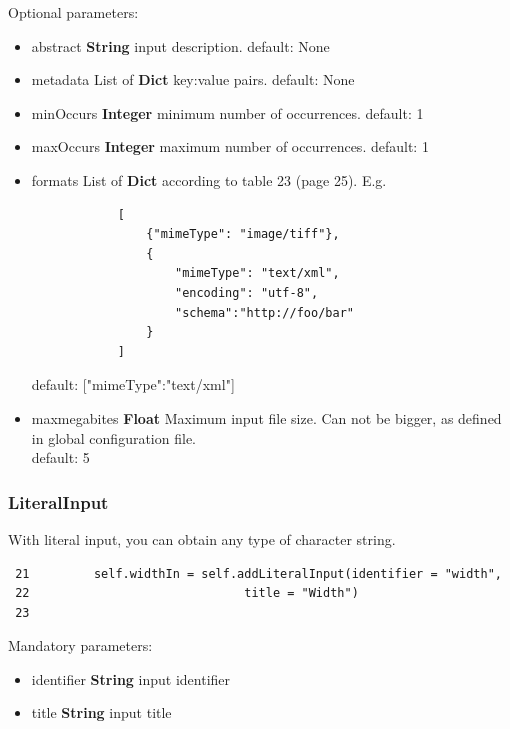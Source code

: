 \documentclass[a4paper,11pt]{report}
\begin{document}
Optional parameters:
\begin{itemize}
\item abstract \textbf{String} input description.
        default: None
\item metadata List of \textbf{Dict} {key:value} pairs.
        default: None
\item minOccurs \textbf{Integer} minimum number of occurrences.
        default: 1
\item maxOccurs \textbf{Integer} maximum number of occurrences.
        default: 1
\item formats List of \textbf{Dict} according to table 23 (page 25). E.g.
    \begin{verbatim}
            [
                {"mimeType": "image/tiff"},
                {
                    "mimeType": "text/xml",
                    "encoding": "utf-8",
                    "schema":"http://foo/bar"
                }
            ]
    \end{verbatim}
        default: [{"mimeType":"text/xml"}]
\item maxmegabites \textbf{Float} Maximum input file size. Can not be bigger, as
        defined in global configuration file.\\
        default: 5
\end{itemize}



\subsubsection{LiteralInput}

With literal input, you can obtain any type of character string.

\begin{verbatim}
 21         self.widthIn = self.addLiteralInput(identifier = "width",
 22                              title = "Width")
 23 
\end{verbatim}

Mandatory parameters:
\begin{itemize}
\item identifier \textbf{String} input identifier
\item title \textbf{String} input title
\end{itemize}
\end{document}
